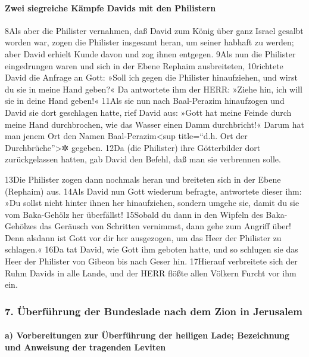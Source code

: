 \hypertarget{zwei-siegreiche-kuxe4mpfe-davids-mit-den-philistern}{%
\paragraph{Zwei siegreiche Kämpfe Davids mit den
Philistern}\label{zwei-siegreiche-kuxe4mpfe-davids-mit-den-philistern}}

8Als aber die Philister vernahmen, daß David zum König über ganz Israel
gesalbt worden war, zogen die Philister insgesamt heran, um seiner
habhaft zu werden; aber David erhielt Kunde davon und zog ihnen
entgegen. 9Als nun die Philister eingedrungen waren und sich in der
Ebene Rephaim ausbreiteten, 10richtete David die Anfrage an Gott: »Soll
ich gegen die Philister hinaufziehen, und wirst du sie in meine Hand
geben?« Da antwortete ihm der HERR: »Ziehe hin, ich will sie in deine
Hand geben!« 11Als sie nun nach Baal-Perazim hinaufzogen und David sie
dort geschlagen hatte, rief David aus: »Gott hat meine Feinde durch
meine Hand durchbrochen, wie das Wasser einen Damm durchbricht!« Darum
hat man jenem Ort den Namen Baal-Perazim\textless sup title=``d.h. Ort
der Durchbrüche''\textgreater✲ gegeben. 12Da (die Philister) ihre
Götterbilder dort zurückgelassen hatten, gab David den Befehl, daß man
sie verbrennen solle.

13Die Philister zogen dann nochmals heran und breiteten sich in der
Ebene (Rephaim) aus. 14Als David nun Gott wiederum befragte, antwortete
dieser ihm: »Du sollst nicht hinter ihnen her hinaufziehen, sondern
umgehe sie, damit du sie vom Baka-Gehölz her überfällst! 15Sobald du
dann in den Wipfeln des Baka-Gehölzes das Geräusch von Schritten
vernimmst, dann gehe zum Angriff über! Denn alsdann ist Gott vor dir her
ausgezogen, um das Heer der Philister zu schlagen.« 16Da tat David, wie
Gott ihm geboten hatte, und so schlugen sie das Heer der Philister von
Gibeon bis nach Geser hin. 17Hierauf verbreitete sich der Ruhm Davids in
alle Lande, und der HERR flößte allen Völkern Furcht vor ihm ein.

\hypertarget{uxfcberfuxfchrung-der-bundeslade-nach-dem-zion-in-jerusalem}{%
\subsubsection{7. Überführung der Bundeslade nach dem Zion in
Jerusalem}\label{uxfcberfuxfchrung-der-bundeslade-nach-dem-zion-in-jerusalem}}

\hypertarget{a-vorbereitungen-zur-uxfcberfuxfchrung-der-heiligen-lade-bezeichnung-und-anweisung-der-tragenden-leviten}{%
\paragraph{a) Vorbereitungen zur Überführung der heiligen Lade;
Bezeichnung und Anweisung der tragenden
Leviten}\label{a-vorbereitungen-zur-uxfcberfuxfchrung-der-heiligen-lade-bezeichnung-und-anweisung-der-tragenden-leviten}}

